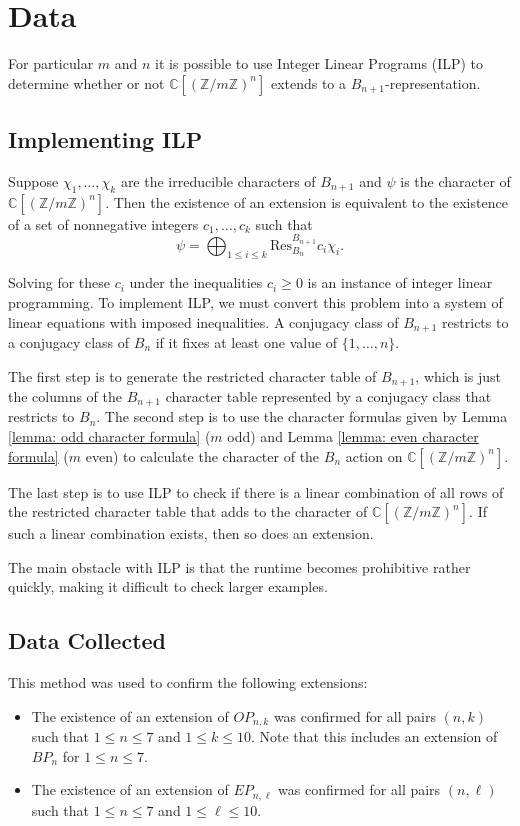 \documentclass{amsart}
\theoremstyle{plain}
\theoremstyle{definition}
\newcommand{\C}{\mathbb{C}}
\newcommand{\Z}{\mathbb{Z}}
\begin{document}
    
\section{Data}\label{section: data}

For particular $m$ and $n$ it is possible to use Integer Linear Programs (ILP) to determine whether or not $\C[(\Z/m\Z)^n]$ extends to a $B_{n+1}$-representation. 
\subsection{Implementing ILP}
Suppose $\chi_1,\dots, \chi_k$ are the irreducible characters of $B_{n+1}$ and $\psi$ is the character of $\C[(\Z/m\Z)^n].$ Then the existence of an extension is equivalent to the existence of a set of nonnegative integers $c_1,\dots, c_k$ such that 
$$\psi = \bigoplus_{1\le i\le k} \mathrm{Res}^{B_{n+1}}_{B_n} c_i \chi_i.$$

 Solving for these $c_i$ under the inequalities $c_i\ge 0$ is an instance of integer linear programming. To implement ILP, we must convert this problem into a system of linear equations with imposed inequalities. A conjugacy class of $B_{n+1}$ restricts to a conjugacy class of $B_n$ if it fixes at least one value of $\{1,\dots, n\}$. 
 
 The first step is to generate the restricted character table of $B_{n+1}$, which is just the columns of the $B_{n+1}$ character table represented by a conjugacy class that restricts to $B_n$. 
 The second step is to use the character formulas given by Lemma \ref{lemma: odd character formula} ($m$ odd) and Lemma \ref{lemma: even character formula} ($m$ even) to calculate the character of the $B_n$ action on $\C[(\Z/m\Z)^n].$

 The last step is to use ILP to check if there is a linear combination of all rows of the restricted character table that adds to the character of $\C[(\Z/m\Z)^n]$. If such a linear combination exists, then so does an extension.

The main obstacle with ILP is that the runtime becomes prohibitive rather quickly, making it difficult to check larger examples.
\subsection{Data Collected}
This method was used to confirm the following extensions:
\begin{itemize}
    \item The existence of an extension of $OP_{n,k}$ was confirmed for all pairs $(n,k)$ such that $1 \leq n \leq 7$ and $1 \leq k \leq 10$. Note that this includes an extension of $BP_n$ for $1 \leq n \leq 7$.
    \item The existence of an extension of $EP_{n,\ell}$ was confirmed for all pairs $(n, \ell)$ such that $1 \leq n \leq 7$ and $1 \leq \ell \leq 10$.
\end{itemize}




\printbibliography
\end{document}
